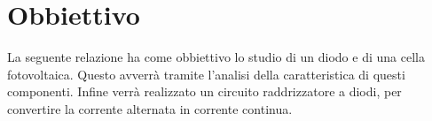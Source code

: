 \section*{Obbiettivo}

La seguente relazione ha come obbiettivo lo studio di un diodo e di una cella fotovoltaica. Questo avverrà tramite l'analisi della caratteristica di questi componenti.
Infine verrà realizzato un circuito raddrizzatore a diodi, per convertire la corrente alternata in corrente continua.
